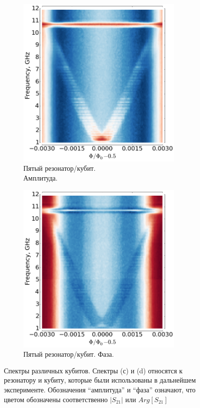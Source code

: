 \documentclass[12pt, twoside]{report}
\numberwithin{equation}{section}
\numberwithin{figure}{section}
\begin{document}
\begin{figure}
\vspace{.5cm}
\begin{subfigure}[t]{0.45\textwidth}
\centering
\includegraphics[width=0.9\textwidth]{Pictures/two-tone_spectrum3}
\caption{Пятый резонатор/кубит.\\ Амплитуда.}
\end{subfigure}%
\begin{subfigure}[t]{0.45\textwidth}
\centering
\includegraphics[width=0.9\textwidth]{Pictures/two-tone_spectrum3_pha}
\caption{Пятый резонатор/кубит. Фаза.}
\end{subfigure}

\caption{Спектры различных кубитов. Спектры (с) и (d) относятся к резонатору и кубиту, которые были использованы в дальнейшем эксперименте. Обозначения ``амплитуда'' и ``фаза'' означают, что цветом обозначены соответственно $|S_{21}|$ или $Arg[S_{21}]$}
\label{fig:two_tone_exp}
\end{figure}
\end{document}
